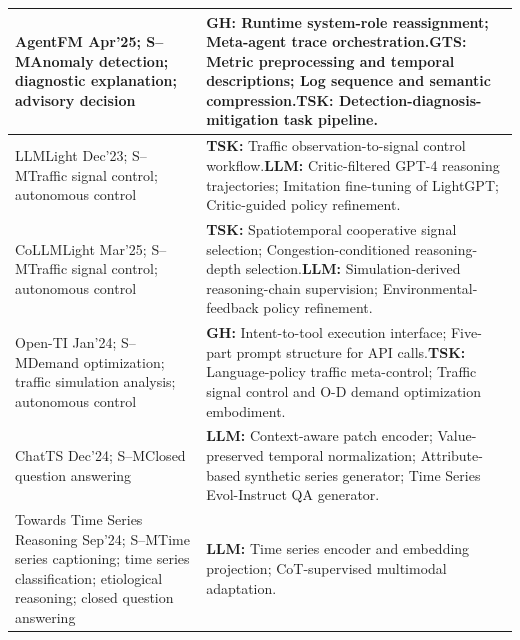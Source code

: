 \documentclass[preprints,article,submit,moreauthors]{Definitions/mdpi}
\newcommand{\typeSMshort}{\textsf{S--M}}
\begin{document}
\begin{longtable}{@{}>{\raggedright\arraybackslash}p{}p{}@{}}
AgentFM \citep{agentfm2025} Apr'25; \typeSMshort{}\newline Anomaly detection; diagnostic explanation; advisory decision & \textbf{GH:} Runtime system-role reassignment; Meta-agent trace orchestration.\newline\textbf{GTS:} Metric preprocessing and temporal descriptions; Log sequence and semantic compression.\newline\textbf{TSK:} Detection-diagnosis-mitigation task pipeline.\\\midrule
LLMLight \citep{llmlight2025} Dec'23; \typeSMshort{}\newline Traffic signal control; autonomous control & \textbf{TSK:} Traffic observation-to-signal control workflow.\newline\textbf{LLM:} Critic-filtered GPT-4 reasoning trajectories; Imitation fine-tuning of LightGPT; Critic-guided policy refinement.\\\midrule
CoLLMLight \citep{collmllight2026} Mar'25; \typeSMshort{}\newline Traffic signal control; autonomous control & \textbf{TSK:} Spatiotemporal cooperative signal selection; Congestion-conditioned reasoning-depth selection.\newline\textbf{LLM:} Simulation-derived reasoning-chain supervision; Environmental-feedback policy refinement.\\\midrule
Open-TI \citep{openti2024} Jan'24; \typeSMshort{}\newline Demand optimization; traffic simulation analysis; autonomous control & \textbf{GH:} Intent-to-tool execution interface; Five-part prompt structure for API calls.\newline\textbf{TSK:} Language-policy traffic meta-control; Traffic signal control and O-D demand optimization embodiment.\\\midrule
ChatTS \citep{chatts2025} Dec'24; \typeSMshort{}\newline Closed question answering & \textbf{LLM:} Context-aware patch encoder; Value-preserved temporal normalization; Attribute-based synthetic series generator; Time Series Evol-Instruct QA generator.\\\midrule
Towards Time Series Reasoning \citep{chow2024tsreasoning} Sep'24; \typeSMshort{}\newline Time series captioning; time series classification; etiological reasoning; closed question answering & \textbf{LLM:} Time series encoder and embedding projection; CoT-supervised multimodal adaptation.\\\midrule

\end{longtable}
\end{document}
